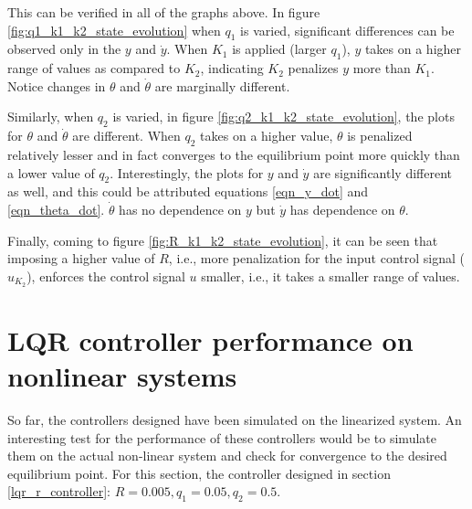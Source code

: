 \documentclass[10pt]{article}
\begin{document}
This can be verified in all of the graphs above. In figure \ref{fig:q1_k1_k2_state_evolution} when $q_1$ is varied, significant differences can be observed only in the $y$ and $\dot{y}$. When $K_1$ is applied (larger $q_1$), $y$ takes on a higher range of values as compared to $K_2$, indicating $K_2$ penalizes $y$ more than $K_1$. Notice changes in $\theta$ and $\dot{\theta}$ are marginally different.

Similarly, when $q_2$ is varied, in figure \ref{fig:q2_k1_k2_state_evolution}, the plots for $\theta$ and $\dot{\theta}$ are different. When $q_2$ takes on a higher value, $\theta$ is penalized relatively lesser and in fact converges to the equilibrium point more quickly than a lower value of $q_2$. Interestingly, the plots for $y$ and $\dot{y}$ are significantly different as well, and this could be attributed equations \ref{eqn_y_dot} and \ref{eqn_theta_dot}. $\dot{\theta}$ has no dependence on $y$ but $\dot{y}$ has dependence on $\theta$.

Finally, coming to figure \ref{fig:R_k1_k2_state_evolution}, it can be seen that imposing a higher value of $R$, i.e., more penalization for the input control signal ($u_{K_2}$), enforces the control signal $u$ smaller, i.e., it takes a smaller range of values.

\section{LQR controller performance on nonlinear systems}

So far, the controllers designed have been simulated on the linearized system. An interesting test for the performance of these controllers would be to simulate them on the actual non-linear system and check for convergence to the desired equilibrium point. For this section, the controller designed in section \ref{lqr_r_controller}: $R = 0.005, q_1 = 0.05, q_2 = 0.5$.
\end{document}

